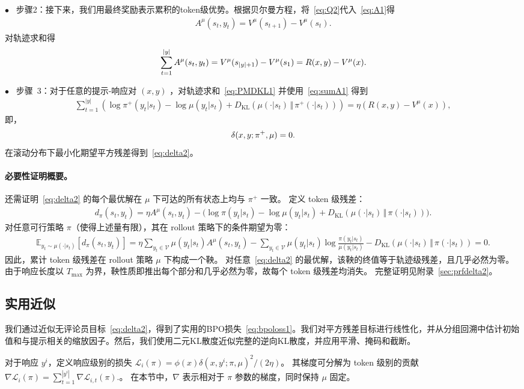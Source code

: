\documentclass[11pt]{article}
\theoremstyle{definition}
\def\eq#1{\begin{equation*}\begin{split}#1\end{split}\end{equation*}}
\def\eql#1#2{\begin{equation}{#1}\begin{split}#2\end{split}\end{equation}}
\def\pr#1{\left( #1 \right ) }
\def\br#1{\left[ #1 \right ] }
\def\calL{\mathcal{L}}
\newcommand\na{\nabla}
\def\prB#1{\Big( #1 \Big)}
\def\KL#1#2{D_{\mathrm{KL}}(#1 \,\Vert\, #2)}
\newcommand\Eb{\mathbb{E}}
\begin{document}
\noindent$\bullet$ ~步骤2：接下来，我们用最终奖励表示累积的token级优势。根据贝尔曼方程，将~\eqref{eq:Q2}代入~\eqref{eq:A1}得
\eq{
    A^{\mu}(s_t,y_t)=V^{\mu}(s_{t+1}) - V^{\mu}(s_t).
}
对轨迹求和得
\eql{\label{eq:sumA1}}{
    \sum_{t=1}^{|y|} A^{\mu}(s_t, y_t) = V^{\mu}(s_{|y|+1}) - V^{\mu}(s_1) = R(x, y) - V^{\mu}(x).   
} 

\noindent$\bullet$ ~步骤~3：对于任意的提示-响应对 $(x, y)$ ，对轨迹求和~\eqref{eq:PMDKL1} 并使用~\eqref{eq:sumA1} 得到  
\eq{
    \sum_{t=1}^{|y|} \pr{\log\pi^+(y_t | s_t) - \log\mu(y_t | s_t) + \KL{\mu(\cdot | s_t)}{\pi^+(\cdot | s_t)}}= \eta \pr{R(x, y) - V^{\mu}(x)},     
}
即，  
\eql{\label{eq:sumdelta2}}{
    \delta(x, y; \pi^+, \mu) = 0. 
}
在滚动分布下最小化期望平方残差得到~\eqref{eq:delta2}。 

\paragraph{必要性证明概要。}
还需证明~\eqref{eq:delta2} 的每个最优解在 $\mu$ 下可达的所有状态上均与 $\pi^+$ 一致。  
定义 token 级残差：  
\eq{
    d_\pi(s_t, y_t) = \eta A^\mu(s_t,y_t) -
    \prB{\log\pi(y_t|s_t) - \log\mu(y_t|s_t) + \KL{\mu(\cdot|s_t)}{\pi(\cdot|s_t)}}.  
}  
对任意可行策略 $\pi$（使得上述量有限），其在 rollout 策略下的条件期望为零：  
\eq{
    \Eb_{y_t\sim\mu(\cdot|s_t)}\br{d_\pi(s_t,y_t)}= \eta\sum_{y_t\in\mathcal V}\mu(y_t|s_t)A^\mu(s_t,y_t) - \sum_{y_t\in\mathcal V}\mu(y_t|s_t)\log\frac{\pi(y_t|s_t)}{\mu(y_t|s_t)} - \KL{\mu(\cdot|s_t)}{\pi(\cdot|s_t)}= 0.  
}  
因此，累计 token 级残差在 rollout 策略 $\mu$ 下构成一个鞅。  
对任意~\eqref{eq:delta2} 的最优解，该鞅的终值等于轨迹级残差，且几乎必然为零。由于响应长度以 $T_{\max}$ 为界，鞅性质即推出每个部分和几乎必然为零，故每个 token 级残差均消失。  
完整证明见附录~\ref{sec:prfdelta2}。 

\subsection{实用近似}\label{sec:binaryKL1}

我们通过近似无评论员目标~\eqref{eq:delta2}，得到了实用的BPO损失~\eqref{eq:bpoloss1}。我们对平方残差目标进行线性化，并从分组回溯中估计初始值和与提示相关的缩放因子。然后，我们使用二元KL散度近似完整的逆向KL散度，并应用平滑、掩码和截断。 

对于响应 $y^i$，定义响应级别的损失 $\calL_i(\pi) = \phi(x)\delta(x,y^i;\pi,\mu)^2/(2\eta)$。  
其梯度可分解为 token 级别的贡献 $
    \na\calL_i(\pi)
    = \sum_{t=1}^{|y^i|} \na\calL_{i,t}(\pi).  
$。  
在本节中，$\na$ 表示相对于 $\pi$ 参数的梯度，同时保持 $\mu$ 固定。
\end{document}
